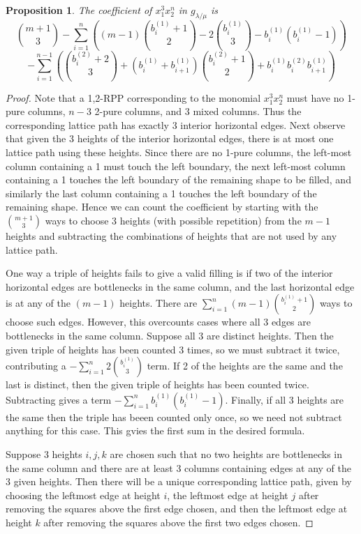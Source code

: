 \documentclass[12pt]{amsart}
\newtheorem{prop}[thm]{Proposition}
\theoremstyle{definition}
\begin{document}
\begin{prop}
The coefficient of $x_1^3 x_2^n$ in $g_{\lambda/\mu}$ is 
\[
\binom{m+1}{3} - \sum_{i=1}^{n} \left((m-1)\binom{b_i^{(1)}+1}{2} - 2 \binom{b_i^{(1)}}{3} - b_i^{(1)}(b_i^{(1)}-1) \right) \]\[ - \sum_{i=1}^{n-1} \left(\binom{b_i^{(2)}+2}{3} + (b_i^{(1)}+b_{i+1}^{(1)})\binom{b_i^{(2)}+1}{2} + b_i^{(1)}b_i^{(2)}b_{i+1}^{(1)}\right)
\]
\end{prop}
\begin{proof}
Note that a 1,2-RPP corresponding to the monomial $x_1^3 x_2^n$ must have no 1-pure columns, $n-3$ 2-pure columns, and $3$ mixed columns. Thus the corresponding lattice path has exactly 3 interior horizontal edges. Next observe that given the 3 heights of the interior horizontal edges, there is at most one lattice path using these heights. Since there are no 1-pure columns, the left-most column containing a 1 must touch the left boundary, the next left-most column containing a 1 touches the left boundary of the remaining shape to be filled, and similarly the last column containing a 1 touches the left boundary of the remaining shape. Hence we can count the coefficient by starting with the $\binom{m+1}{3}$ ways to choose 3 heights (with possible repetition) from the $m-1$ heights and subtracting the combinations of heights that are not used by any lattice path.

One way a triple of heights fails to give a valid filling is if two of the interior horizontal edges are bottlenecks in the same column, and the last horizontal edge is at any of the $(m-1)$ heights. There are $\sum_{i=1}^n (m-1)\binom{b_i^{(1)}+1}{2}$ ways to choose such edges. However, this overcounts cases where all 3 edges are bottlenecks in the same column. Suppose all 3 are distinct heights. Then the given triple of heights has been counted 3 times, so we must subtract it twice, contributing a $-\sum_{i=1}^n 2 \binom{b_i^{(1)}}{3}$ term. If 2 of the heights are the same and the last is distinct, then the given triple of heights has been counted twice. Subtracting gives a term $-\sum_{i=1}^n b_i^{(1)}(b_i^{(1)}-1)$. Finally, if all 3 heights are the same then the triple has beeen counted only once, so we need not subtract anything for this case. This gvies the first sum in the desired formula.

Suppose 3 heights $i,j,k$ are chosen such that no two heights are bottlenecks in the same column and there are at least 3 columns containing edges at any of the 3 given heights. Then there will be a unique corresponding lattice path, given by choosing the leftmost edge at height $i$, the leftmost edge at height $j$ after removing the squares above the first edge chosen, and then the leftmost edge at height $k$ after removing the squares above the first two edges chosen.


\end{proof}
\end{document}
